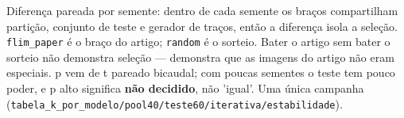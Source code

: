 \footnotesize Diferença pareada por semente: dentro de cada semente os braços compartilham partição, conjunto de teste e gerador de traços, então a diferença isola a seleção. \texttt{flim\_paper} é o braço do artigo; \texttt{random} é o sorteio. Bater o artigo sem bater o sorteio não demonstra seleção --- demonstra que as imagens do artigo não eram especiais. p vem de t pareado bicaudal; com poucas sementes o teste tem pouco poder, e p alto significa \textbf{não decidido}, não 'igual'. Uma única campanha (\texttt{tabela\_k\_por\_modelo/pool40/teste60/iterativa/estabilidade}).
\normalsize
